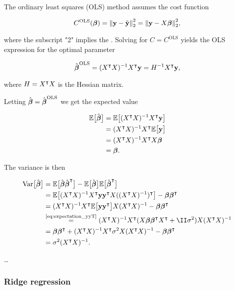 The ordinary least squares (OLS) method assumes the cost function

\begin{align*}
    C^\text{OLS}(\boldsymbol{\beta}) = \norm{\mathbf{y}-\tilde{\mathbf{y}}}_2^{2} = \norm{\mathbf{y}-X\boldsymbol{\beta}}_2^{2},
\end{align*}

where the subscript "2" implies the . Solving  for $C=C^\text{OLS}$ yields the OLS expression for the optimal parameter

\begin{align*}
    \hat{\boldsymbol{\beta}}^\text{OLS} = (X^\intercal X)^{-1} X^\intercal \mathbf{y} = H^{-1} X^\intercal \mathbf{y},
\end{align*}

where $H = X^\intercal X$ is the Hessian matrix.

Letting $\hat{\boldsymbol{\beta}} = \hat{\boldsymbol{\beta}}^\text{OLS}$ we get the expected value 

\begin{align*}
    \mathbb{E}\big[\hat{\boldsymbol{\beta}}\big] &= \mathbb{E}\big[(X^\intercal X)^{-1} X^\intercal \mathbf{y}\big] \\
    &= (X^\intercal X)^{-1} X^\intercal \mathbb{E}\big[\mathbf{y}\big] \\
    &= (X^\intercal X)^{-1} X^\intercal X \boldsymbol{\beta} \\
    &= \boldsymbol{\beta}.
\end{align*}

The variance is then 

\begin{align*}
    \variance{\optbeta} &= \EE{\optbeta \optbeta\TT} -\EE{\optbeta} \EE{\optbeta\TT} \\
    &= \EE{\invhessian X\TT  \vec{y} \vec{y}\TT X (\invhessian)\TT} - \svec{\beta} \svec{\beta}\TT \\
    &= \invhessian X\TT \EE{ \vec{y} \vec{y}\TT } X \invhessian - \svec{\beta} \svec{\beta}\TT \\
    &\stackrel{\text{\eqref{eq:expectation_yyT}}}{=}\invhessian X\TT ( X\svec{\beta} \svec{\beta}\TT X\TT+ \II\sigma^2) X \invhessian \\
    &= \svec{\beta} \svec{\beta} \TT + \invhessian X\TT \sigma^2 X \invhessian - \svec{\beta} \svec{\beta} \TT \\
    &= \sigma^2 \invhessian.
\end{align*}



\dots



\subsubsection{Ridge regression}\label{sec:Ridge}

